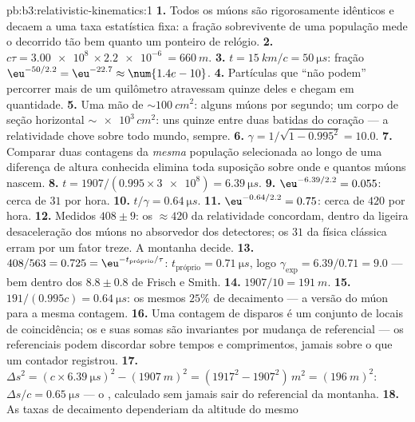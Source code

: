 \begin{solution}{pb:b3:relativistic-kinematics:1}
\textbf{1.} Todos os múons são rigorosamente idênticos e decaem a uma
taxa estatística fixa: a fração sobrevivente de uma população mede o
 decorrido tão bem quanto um ponteiro de relógio.
\textbf{2.} $c\tau = \qty{3.00e8}{} \times \qty{2.2e-6}{} =
\qty{660}{m}$.
\textbf{3.} $t = \qty{15}{km}/c = \qty{50}{\micro s}$: fração
$\eu^{-50/2.2} = \eu^{-22.7} \approx \num{1.4e-10}$.
\textbf{4.} Partículas que ``não podem'' percorrer mais de um
quilômetro atravessam quinze deles e chegam em quantidade.
\textbf{5.} Uma mão de $\sim\qty{100}{cm^2}$: alguns múons por
segundo; um corpo de seção horizontal $\sim\num{e3}\,\unit{cm^2}$: uns
quinze entre duas batidas do coração --- a relatividade chove sobre
todo mundo, sempre.
\textbf{6.} $\gamma = 1/\sqrt{1 - 0.995^2} = 10.0$.
\textbf{7.} Comparar duas contagens da \emph{mesma} população
selecionada ao longo de uma diferença de altura conhecida elimina toda
suposição sobre onde e quantos múons nascem.
\textbf{8.} $t = 1907/(0.995 \times \num{3e8}) = \qty{6.39}{\micro s}$.
\textbf{9.} $\eu^{-6.39/2.2} = 0.055$: cerca de $31$ por hora.
\textbf{10.} $t/\gamma = \qty{0.64}{\micro s}$.
\textbf{11.} $\eu^{-0.64/2.2} = 0.75$: cerca de $420$ por hora.
\textbf{12.} Medidos $408 \pm 9$: os $\approx 420$ da relatividade
concordam, dentro da ligeira desaceleração dos múons no absorvedor dos
detectores; os $31$ da física clássica erram por um fator treze. A
montanha decide.
\textbf{13.} $408/563 = 0.725 = \eu^{-t_{\text{próprio}}/\tau}$:
$t_{\text{próprio}} = \qty{0.71}{\micro s}$, logo $\gamma_{\exp} =
6.39/0.71 = 9.0$ --- bem dentro dos $8.8 \pm 0.8$ de Frisch e Smith.
\textbf{14.} $1907/10 = \qty{191}{m}$.
\textbf{15.} $191/(0.995c) = \qty{0.64}{\micro s}$: os mesmos $25\%$ de
decaimento --- a versão do múon para a mesma contagem.
\textbf{16.} Uma contagem de disparos é um conjunto de  locais
de coincidência; os  e suas somas são invariantes por mudança de
referencial --- os referenciais podem discordar sobre tempos e
comprimentos, jamais sobre o que um contador registrou.
\textbf{17.} $\Delta s^2 = (c \times \qty{6.39}{\micro s})^2 -
(\qty{1907}{m})^2 = (1917^2 - 1907^2)\,\unit{m^2} = (\qty{196}{m})^2$:
$\Delta s/c = \qty{0.65}{\micro s}$ --- o , calculado sem
jamais sair do referencial da montanha.
\textbf{18.} As taxas de decaimento dependeriam da altitude do mesmo

\end{solution}
